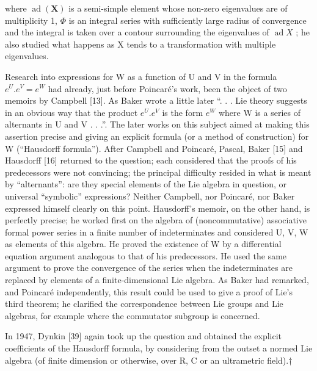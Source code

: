 where \(\operatorname{ad}(\mathbf{X})\) is a semi-simple element whose non-zero eigenvalues are of multiplicity 1, \(\Phi\) is an integral series with sufficiently large radius of convergence and the integral is taken over a contour surrounding the eigenvalues of \(\operatorname{ad} X\) ; he also studied what happens as X tends to a transformation with multiple eigenvalues.

Research into expressions for W as a function of U and V in the formula \(e^{U}.e^{V}=e^{W}\) had already, just before Poincaré's work, been the object of two memoirs by Campbell {[}13{]}. As Baker wrote a little later ``. . . Lie theory suggests in an obvious way that the product \(e^{U}.e^{V}\) is the form \(e^{W}\) where W is a series of alternants in U and V . . .''. The later works on this subject aimed at making this assertion precise and giving an explicit formula (or a method of construction) for W (``Hausdorff formula''). After Campbell and Poincaré, Pascal, Baker {[}15{]} and Hausdorff {[}16{]} returned to the question; each considered that the proofs of his predecessors were not convincing; the principal difficulty resided in what is meant by ``alternants'': are they special elements of the Lie algebra in question, or universal ``symbolic'' expressions? Neither Campbell, nor Poincaré, nor Baker expressed himself clearly on this point. Hausdorff's memoir, on the other hand, is perfectly precise; he worked first on the algebra of (noncommutative) associative formal power series in a finite number of indeterminates and considered U, V, W as elements of this algebra. He proved the existence of W by a differential equation argument analogous to that of his predecessors. He used the same argument to prove the convergence of the series when the indeterminates are replaced by elements of a finite-dimensional Lie algebra. As Baker had remarked, and Poincaré independently, this result could be used to give a proof of Lie's third theorem; he clarified the correspondence between Lie groups and Lie algebras, for example where the commutator subgroup is concerned.

In 1947, Dynkin {[}39{]} again took up the question and obtained the explicit coefficients of the Hausdorff formula, by considering from the outset a normed Lie algebra (of finite dimension or otherwise, over R, C or an ultrametric field).†



